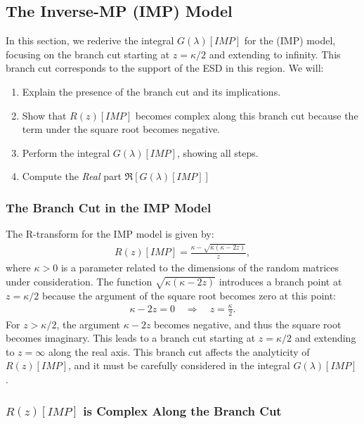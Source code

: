 \subsection{The Inverse-MP (IMP) Model}
\label{sxn:IMP}
In this section, we rederive the integral $G(\lambda)[IMP]$ for the \InverseMP (IMP) model, focusing on the branch cut starting at $z = \kappa/2$ and extending to infinity. 
This branch cut corresponds to the support of the ESD in this region. 
We will:
\begin{enumerate}
\item Explain the presence of the branch cut and its implications.
\item Show that $R(z)[IMP]$ becomes complex along this branch cut because the term under the square root becomes negative.
\item Perform the integral $G(\lambda)[IMP]$, showing all steps.
\item Compute the \emph{Real} part  $\Re[G(\lambda)[IMP]]$ 
\end{enumerate}

\subsubsection{The Branch Cut in the IMP Model}

The R-transform for the IMP model is given by:
\begin{align}
\label{eqn:iw_r_transf}
R(z)[IMP] = \frac{\kappa - \sqrt{\kappa(\kappa - 2z)}}{z},
\end{align}
where $\kappa > 0$ is a parameter related to the dimensions of the random matrices under consideration.
The function $\sqrt{\kappa(\kappa - 2z)}$ introduces a branch point at $z = \kappa/2$ because the argument of the square root becomes zero at this point:
\begin{align}
\kappa - 2z = 0 \quad \Rightarrow \quad z = \frac{\kappa}{2}.
\end{align}
For $z > \kappa/2$, the argument $\kappa - 2z$ becomes negative, and thus the square root becomes imaginary. 
This leads to a branch cut starting at $z = \kappa/2$ and extending to $z = \infty$ along the real axis. 
This branch cut affects the analyticity of $R(z)[IMP]$, and it must be carefully considered in the integral $G(\lambda)[IMP]$.

\subsubsection{$R(z)[IMP]$ is Complex Along the Branch Cut}

